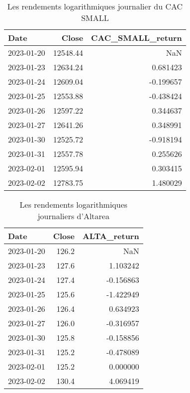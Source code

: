 \documentclass[a4paper, 12pt]{report}
\begin{document}
\begin{table}[H]
	\centering
	\begin{tabular}{@{}lrr@{}}
		\toprule
		Date       & Close    & CAC\_SMALL\_return \\ \midrule
		2023-01-20 & 12548.44 & NaN                \\
		2023-01-23 & 12634.24 & 0.681423           \\
		2023-01-24 & 12609.04 & -0.199657          \\
		2023-01-25 & 12553.88 & -0.438424          \\
		2023-01-26 & 12597.22 & 0.344637           \\
		2023-01-27 & 12641.26 & 0.348991           \\
		2023-01-30 & 12525.72 & -0.918194          \\
		2023-01-31 & 12557.78 & 0.255626           \\
		2023-02-01 & 12595.94 & 0.303415           \\
		2023-02-02 & 12783.75 & 1.480029           \\ \bottomrule
	\end{tabular}
	\caption{Les rendements logarithmiques journalier du CAC SMALL}
	\label{tab:my-table1}
\end{table}

\begin{table}[H]
	\centering
	\begin{tabular}{@{}lrr@{}}
		\toprule
		Date         & \multicolumn{1}{l}{Close} & \multicolumn{1}{l}{ALTA\_return} \\ \midrule
		2023-01-20   & 126.2                     & NaN                              \\
		2023-01-23   & 127.6                     & 1.103242                         \\
		2023-01-24   & 127.4                     & -0.156863                        \\
		2023-01-25   & 125.6                     & -1.422949                        \\
		2023-01-26   & 126.4                     & 0.634923                         \\
		2023-01-27   & 126.0                     & -0.316957                        \\
		2023-01-30   & 125.8                     & -0.158856                        \\
		2023-01-31   & 125.2                     & -0.478089                        \\
		2023-02-01   & 125.2                     & 0.000000                         \\
		2023-02-02 & 130.4                     & 4.069419                         \\ \bottomrule
	\end{tabular}
	\caption{Les rendements logarithmiques journaliers d'Altarea}
	\label{tab:my-table2}
\end{table}
\end{document}
